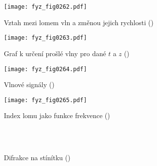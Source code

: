     \begin{figure}[ht!] %
      \centering
      \texttt{[image: fyz\_fig0262.pdf]}
      \caption{Vztah mezi lomem vln a změnou jejich rychlosti
               (\cite[s.~412]{Feynman01})}
      \label{fyz:fig0262}
    \end{figure}

    \begin{figure}[ht!] %
      \centering
      \texttt{[image: fyz\_fig0263.pdf]}
      \caption{Graf k určení prošlé vlny pro dané \(t\) a \(z\)
               (\cite[s.~413]{Feynman01})}
      \label{fyz:fig0263}
    \end{figure}
    
    \begin{figure}[ht!] %
      \centering
      \texttt{[image: fyz\_fig0264.pdf]}
      \caption{Vlnové signály
               (\cite[s.~418]{Feynman01})}
      \label{fyz:fig0264}
    \end{figure}

    \begin{figure}[ht!] %
      \centering
      \texttt{[image: fyz\_fig0265.pdf]}
      \caption{Index lomu jako funkce frekvence
               (\cite[s.~419]{Feynman01})}
      \label{fyz:fig0265}
    \end{figure}
    

    \begin{figure}[ht!]  %
      \centering
                     \\
                     \\
      \caption{Difrakce na stínítku
               (\cite[s.~422]{Feynman01})}
      \label{fyz:fig0266}
    \end{figure}

